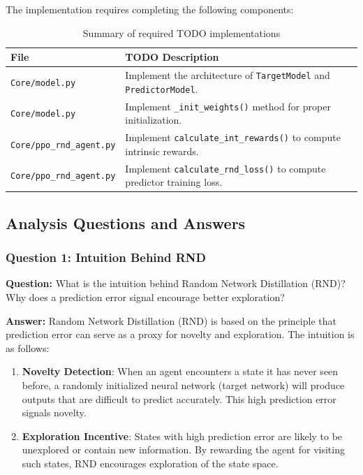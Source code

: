 \documentclass[12pt]{article}
\begin{document}
{{{The implementation requires completing the following components:

\begin{table}[H]
\centering
\renewcommand{\arraystretch}{1.3}
\begin{tabular}{ll}
\toprule
\textbf{File} & \textbf{TODO Description} \\
\midrule
\texttt{Core/model.py} & Implement the architecture of \texttt{TargetModel} and \texttt{PredictorModel}. \\
\texttt{Core/model.py} & Implement \texttt{\_init\_weights()} method for proper initialization. \\
\texttt{Core/ppo\_rnd\_agent.py} & Implement \texttt{calculate\_int\_rewards()} to compute intrinsic rewards. \\
\texttt{Core/ppo\_rnd\_agent.py} & Implement \texttt{calculate\_rnd\_loss()} to compute predictor training loss. \\
\bottomrule
\end{tabular}
\caption{Summary of required TODO implementations}
\end{table}
    
\subsection{Analysis Questions and Answers}

\subsubsection{Question 1: Intuition Behind RND}

\textbf{Question:} What is the intuition behind Random Network Distillation (RND)? Why does a prediction error signal encourage better exploration?

\textbf{Answer:} Random Network Distillation (RND) is based on the principle that prediction error can serve as a proxy for novelty and exploration. The intuition is as follows:

\begin{enumerate}
    \item \textbf{Novelty Detection}: When an agent encounters a state it has never seen before, a randomly initialized neural network (target network) will produce outputs that are difficult to predict accurately. This high prediction error signals novelty.
    
    \item \textbf{Exploration Incentive}: States with high prediction error are likely to be unexplored or contain new information. By rewarding the agent for visiting such states, RND encourages exploration of the state space.
    

\end{enumerate}}}}
\end{document}
